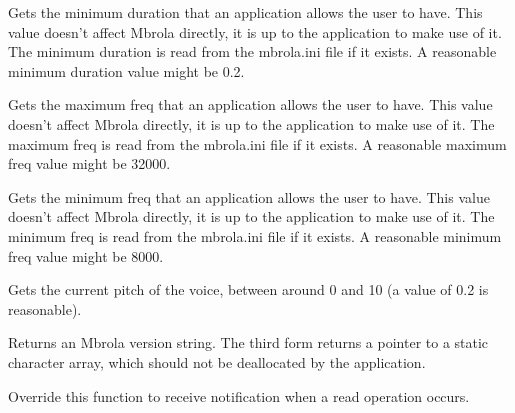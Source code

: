 \label{wxmbrolagetminduration}


Gets the minimum duration that an application allows the user to have. This value doesn't
affect Mbrola directly, it is up to the application to make use of it. The minimum
duration is read from the mbrola.ini file if it exists. A reasonable minimum duration value might be 0.2.

\label{wxmbrolagetmaxfreq}


Gets the maximum freq that an application allows the user to have. This value doesn't
affect Mbrola directly, it is up to the application to make use of it. The maximum
freq is read from the mbrola.ini file if it exists. A reasonable maximum freq value might be 32000.

\label{wxmbrolagetminfreq}


Gets the minimum freq that an application allows the user to have. This value doesn't
affect Mbrola directly, it is up to the application to make use of it. The minimum
freq is read from the mbrola.ini file if it exists. A reasonable minimum freq value might be 8000.

\label{wxmbrolagetpitch}


Gets the current pitch of the voice, between around 0 and 10 (a value of 0.2 is reasonable).

\label{wxmbrolagetversion}




Returns an Mbrola version string. The third form returns a pointer to a static character
array, which should not be deallocated by the application.

\label{wxmbrolaonread}


Override this function to receive notification when a read operation occurs.

